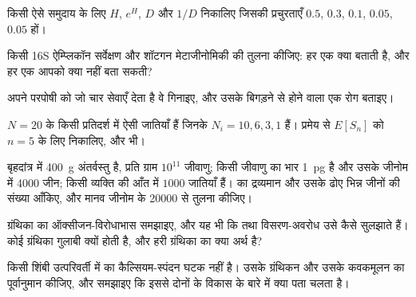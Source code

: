 \begin{exercise}[$\star$]\label{exo:b3:microbiomes:2}
किसी ऐसे समुदाय के लिए $H$, $e^{H}$, $D$ और $1/D$ निकालिए जिसकी
प्रचुरताएँ $0.5$, $0.3$, $0.1$, $0.05$, $0.05$ हों।
\end{exercise}

\begin{exercise}[$\star$]\label{exo:b3:microbiomes:3}
किसी 16S ऐम्प्लिकॉन सर्वेक्षण और शॉटगन मेटाजीनोमिकी की तुलना कीजिए:
हर एक क्या बताती है, और हर एक आपको क्या नहीं बता सकती?
\end{exercise}

\begin{exercise}[$\star$]\label{exo:b3:microbiomes:4}
 अपने परपोषी को जो चार सेवाएँ देता है वे गिनाइए, और
उसके बिगड़ने से होने वाला एक रोग बताइए।
\end{exercise}

\begin{exercise}[$\star\star$]\label{exo:b3:microbiomes:5}
$N = 20$  के किसी प्रतिदर्श में ऐसी जातियाँ हैं जिनके $N_{i} = 10, 6, 3, 1$ हैं।
प्रमेय से $E[S_{n}]$ को $n = 5$ के लिए निकालिए, और  भी।
\end{exercise}

\begin{exercise}[$\star\star$]\label{exo:b3:microbiomes:6}
बृहदांत्र में \qty{400}{g} अंतर्वस्तु है, प्रति ग्राम $10^{11}$
जीवाणु; किसी जीवाणु का भार \qty{1}{pg} है और उसके जीनोम में \num{4000}
जीन; किसी व्यक्ति की आँत में $1000$ जातियाँ हैं।  का
द्रव्यमान और उसके ढोए भिन्न जीनों की संख्या आँकिए, और मानव जीनोम के
\num{20000} से तुलना कीजिए।
\end{exercise}

\begin{exercise}[$\star\star$]\label{exo:b3:microbiomes:7}
ग्रंथिका का ऑक्सीजन-विरोधाभास समझाइए, और यह भी कि  तथा
विसरण-अवरोध उसे कैसे सुलझाते हैं। कोई ग्रंथिका गुलाबी क्यों होती है,
और हरी ग्रंथिका का क्या अर्थ है?
\end{exercise}

\begin{exercise}[$\star\star$]\label{exo:b3:microbiomes:8}
किसी शिंबी उत्परिवर्ती में  का कैल्सियम-स्पंदन घटक नहीं
है। उसके ग्रंथिकन और उसके कवकमूलन का पूर्वानुमान कीजिए, और समझाइए कि
इससे दोनों  के विकास के बारे में क्या पता चलता है।
\end{exercise}

